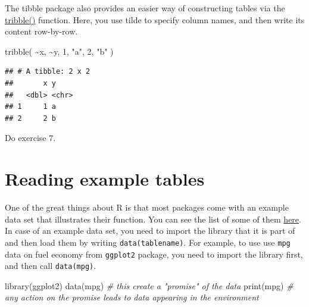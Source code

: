 \documentclass[
]{book}
\newenvironment{Shaded}{\begin{snugshade}}{\end{snugshade}}
\newcommand{\CommentTok}[1]{\textcolor[rgb]{0.56,0.35,0.01}{\textit{#1}}}
\newcommand{\DecValTok}[1]{\textcolor[rgb]{0.00,0.00,0.81}{#1}}
\newcommand{\FunctionTok}[1]{\textcolor[rgb]{0.00,0.00,0.00}{#1}}
\newcommand{\NormalTok}[1]{#1}
\newcommand{\SpecialCharTok}[1]{\textcolor[rgb]{0.00,0.00,0.00}{#1}}
\newcommand{\StringTok}[1]{\textcolor[rgb]{0.31,0.60,0.02}{#1}}
\begin{document}
The tibble package also provides an easier way of constructing tables via the \href{https://tibble.tidyverse.org/reference/tribble.html}{tribble()} function. Here, you use tilde to specify column names, and then write its content row-by-row.

\begin{Shaded}
\begin{Highlighting}[]
\FunctionTok{tribble}\NormalTok{(}
    \SpecialCharTok{\textasciitilde{}}\NormalTok{x, }\SpecialCharTok{\textasciitilde{}}\NormalTok{y,}
    \DecValTok{1}\NormalTok{,  }\StringTok{"a"}\NormalTok{,}
    \DecValTok{2}\NormalTok{,  }\StringTok{"b"}
\NormalTok{)}
\end{Highlighting}
\end{Shaded}

\begin{verbatim}
## # A tibble: 2 x 2
##       x y    
##   <dbl> <chr>
## 1     1 a    
## 2     2 b
\end{verbatim}

Do exercise 7.

\hypertarget{data}{%
\section{Reading example tables}\label{data}}

One of the great things about R is that most packages come with an example data set that illustrates their function. You can see the list of some of them \href{https://www.rdocumentation.org/packages/datasets}{here}. In case of an example data set, you need to import the library that it is part of and then load them by writing \texttt{data(tablename)}. For example, to use use \texttt{mpg} data on fuel economy from \texttt{ggplot2} package, you need to import the library first, and then call \texttt{data(mpg)}.

\begin{Shaded}
\begin{Highlighting}[]
\FunctionTok{library}\NormalTok{(ggplot2)}
\FunctionTok{data}\NormalTok{(mpg) }\CommentTok{\# this create a "promise" of the data}
\FunctionTok{print}\NormalTok{(mpg) }\CommentTok{\# any action on the promise leads to data appearing in the environment}
\end{Highlighting}
\end{Shaded}
\end{document}
